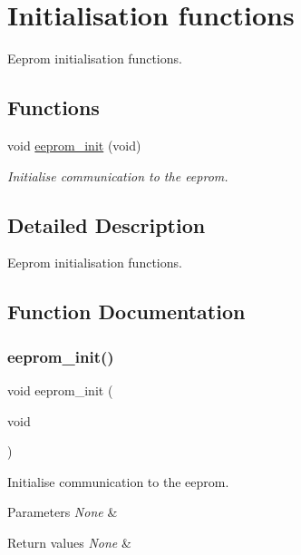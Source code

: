 \hypertarget{group___eeprom___init}{}\section{Initialisation functions}
\label{group___eeprom___init}


Eeprom initialisation functions.  


\subsection*{Functions}
\begin{DoxyCompactItemize}
\item 
void \hyperlink{group___eeprom___init_ga4ec7f9d780da432051aa74ec5892a94c}{eeprom\+\_\+init} (void)
\begin{DoxyCompactList}\small\item\em Initialise communication to the eeprom. \end{DoxyCompactList}\end{DoxyCompactItemize}


\subsection{Detailed Description}
Eeprom initialisation functions. 



\subsection{Function Documentation}
\mbox{\label{group___eeprom___init_ga4ec7f9d780da432051aa74ec5892a94c}} 
\subsubsection{\texorpdfstring{eeprom\+\_\+init()}{eeprom\_init()}}
{\footnotesize\ttfamily void eeprom\+\_\+init (\begin{DoxyParamCaption}\item[{void}]{ }\end{DoxyParamCaption})}



Initialise communication to the eeprom. 


\begin{DoxyParams}{Parameters}
{\em None} & \\
\hline
\end{DoxyParams}

\begin{DoxyRetVals}{Return values}
{\em None} & \\
\hline
\end{DoxyRetVals}
